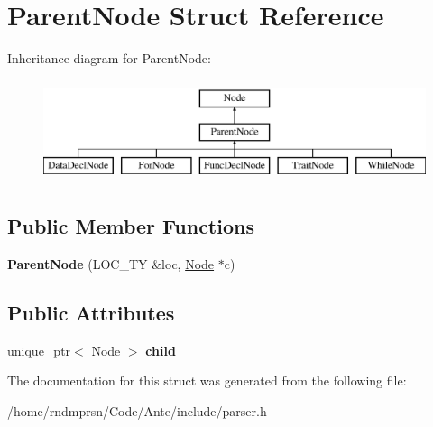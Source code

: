 \hypertarget{structParentNode}{}\section{Parent\+Node Struct Reference}
\label{structParentNode}
Inheritance diagram for Parent\+Node\+:\begin{figure}[H]
\begin{center}
\leavevmode
\includegraphics[height=3.000000cm]{structParentNode}
\end{center}
\end{figure}
\subsection*{Public Member Functions}
\begin{DoxyCompactItemize}
\item 
\mbox{\label{structParentNode_ad963927875f7c5e4bb529a2d4072cffd}} 
{\bfseries Parent\+Node} (L\+O\+C\+\_\+\+TY \&loc, \hyperlink{structNode}{Node} $\ast$c)
\end{DoxyCompactItemize}
\subsection*{Public Attributes}
\begin{DoxyCompactItemize}
\item 
\mbox{\label{structParentNode_a66b7a4165bc777ba4b0f81117272b4f7}} 
unique\+\_\+ptr$<$ \hyperlink{structNode}{Node} $>$ {\bfseries child}
\end{DoxyCompactItemize}


The documentation for this struct was generated from the following file\+:\begin{DoxyCompactItemize}
\item 
/home/rndmprsn/\+Code/\+Ante/include/parser.\+h\end{DoxyCompactItemize}
